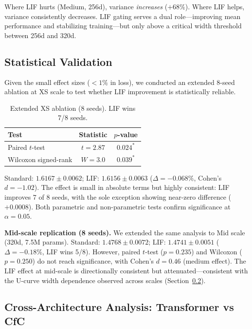 \documentclass[11pt]{article}
\begin{document}
Where LIF hurts (Medium, 256d), variance \emph{increases} ($+68\%$). Where LIF helps, variance consistently decreases. LIF gating serves a dual role---improving mean performance and stabilizing training---but only above a critical width threshold between 256d and 320d.

\subsection{Statistical Validation}
\label{sec:stats}

Given the small effect sizes ($< 1\%$ in loss), we conducted an extended 8-seed ablation at XS scale to test whether LIF improvement is statistically reliable.

\begin{table}[h]
\centering
\caption{Extended XS ablation (8 seeds). LIF wins 7/8 seeds.}
\label{tab:xs-stats}
\begin{tabular}{lcc}
\toprule
\textbf{Test} & \textbf{Statistic} & \textbf{$p$-value} \\
\midrule
Paired $t$-test & $t = 2.87$ & $0.024^*$ \\
Wilcoxon signed-rank & $W = 3.0$ & $0.039^*$ \\
\bottomrule
\end{tabular}
\end{table}

Standard: $1.6167 \pm 0.0062$; LIF: $1.6156 \pm 0.0063$ ($\Delta = -0.068\%$, Cohen's $d = -1.02$). The effect is small in absolute terms but highly consistent: LIF improves 7 of 8 seeds, with the sole exception showing near-zero difference ($+0.0008$). Both parametric and non-parametric tests confirm significance at $\alpha = 0.05$.

\textbf{Mid-scale replication (8 seeds).} We extended the same analysis to Mid scale (320d, 7.5M params). Standard: $1.4768 \pm 0.0072$; LIF: $1.4741 \pm 0.0051$ ($\Delta = -0.18\%$, LIF wins 5/8). However, paired $t$-test ($p = 0.235$) and Wilcoxon ($p = 0.250$) do not reach significance, with Cohen's $d = 0.46$ (medium effect). The LIF effect at mid-scale is directionally consistent but attenuated---consistent with the U-curve width dependence observed across scales (Section~\ref{sec:cross-arch}).

\subsection{Cross-Architecture Analysis: Transformer vs CfC}
\label{sec:cross-arch}
\end{document}
